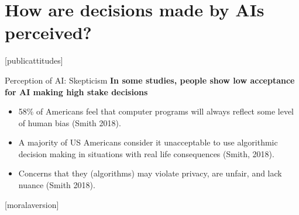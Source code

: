 \documentclass[8pt]{beamer}
\begin{document}
	\section{How are decisions made by AIs perceived?}

	[publicattitudes]

	\begin{frame}[t]{Perception of AI: Skepticism}
		\textbf{In some studies, people show low acceptance for AI making high stake decisions}
		\begin{itemize}
			\item 58\% of Americans feel that computer programs will always reflect some level of human bias (Smith 2018).
			\item A majority of US Americans consider it unacceptable to use algorithmic decision making in situations with real life consequences (Smith, 2018).
			\item Concerns that they (algorithms) may violate privacy, are unfair, and lack nuance (Smith 2018).
		\end{itemize}
		\vspace{0.5cm}
		\centering
	\end{frame}

	[moralaversion]
\end{document}
